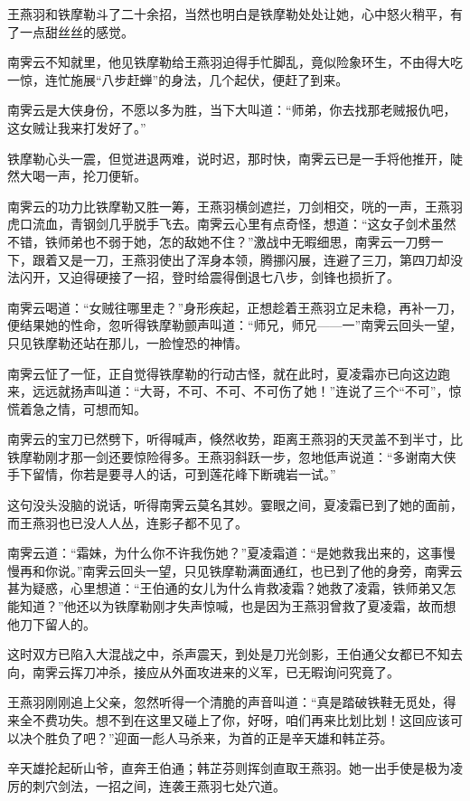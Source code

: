 \documentclass[12pt,oneside]{book}
\begin{document}
王燕羽和铁摩勒斗了二十余招，当然也明白是铁摩勒处处让她，心中怒火稍平，有了一点甜丝丝的感觉。

南霁云不知就里，他见铁摩勒给王燕羽迫得手忙脚乱，竟似险象环生，不由得大吃一惊，连忙施展``八步赶蝉''的身法，几个起伏，便赶了到来。

南霁云是大侠身份，不愿以多为胜，当下大叫道：``师弟，你去找那老贼报仇吧，这女贼让我来打发好了。''

铁摩勒心头一震，但觉进退两难，说时迟，那时快，南霁云已是一手将他推开，陡然大喝一声，抡刀便斩。

南霁云的功力比铁摩勒又胜一筹，王燕羽横剑遮拦，刀剑相交，咣的一声，王燕羽虎口流血，青钢剑几乎脱手飞去。南霁云心里有点奇怪，想道：``这女子剑术虽然不错，铁师弟也不弱于她，怎的敌她不住？''激战中无暇细思，南霁云一刀劈一下，跟着又是一刀，王燕羽使出了浑身本领，腾挪闪展，连避了三刀，第四刀却没法闪开，又迫得硬接了一招，登时给震得倒退七八步，剑锋也损折了。

南霁云喝道：``女贼往哪里走？''身形疾起，正想趁着王燕羽立足未稳，再补一刀，便结果她的性命，忽听得铁摩勒颤声叫道：``师兄，师兄------一''南霁云回头一望，只见铁摩勒还站在那儿，一脸惶恐的神情。

南霁云怔了一怔，正自觉得铁摩勒的行动古怪，就在此时，夏凌霜亦已向这边跑来，远远就扬声叫道：``大哥，不可、不可、不可伤了她！''连说了三个``不可''，惊慌着急之情，可想而知。

南霁云的宝刀已然劈下，听得喊声，倏然收势，距离王燕羽的天灵盖不到半寸，比铁摩勒刚才那一剑还要惊险得多。王燕羽斜跃一步，忽地低声说道：``多谢南大侠手下留情，你若是要寻人的话，可到莲花峰下断魂岩一试。''

这句没头没脑的说话，听得南霁云莫名其妙。霎眼之间，夏凌霜已到了她的面前，而王燕羽也已没人人丛，连影子都不见了。

南霁云道：``霜妹，为什么你不许我伤她？''夏凌霜道：``是她救我出来的，这事慢慢再和你说。''南霁云回头一望，只见铁摩勒满面通红，也已到了他的身旁，南霁云甚为疑惑，心里想道：``王伯通的女儿为什么肯救凌霜？她救了凌霜，铁师弟又怎能知道？''他还以为铁摩勒刚才失声惊喊，也是因为王燕羽曾救了夏凌霜，故而想他刀下留人的。

这时双方已陷入大混战之中，杀声震天，到处是刀光剑影，王伯通父女都已不知去向，南霁云挥刀冲杀，接应从外面攻进来的义军，已无暇询问究竟了。

王燕羽刚刚追上父亲，忽然听得一个清脆的声音叫道：``真是踏破铁鞋无觅处，得来全不费功失。想不到在这里又碰上了你，好呀，咱们再来比划比划！这回应该可以决个胜负了吧？''迎面一彪人马杀来，为首的正是辛天雄和韩芷芬。

辛天雄抡起斫山爷，直奔王伯通；韩芷芬则挥剑直取王燕羽。她一出手使是极为凌厉的刺穴剑法，一招之间，连袭王燕羽七处穴道。
\end{document}
